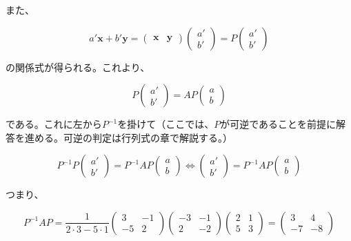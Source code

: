 \documentclass[dvipdfmx,autodetect-engine]{jsarticle}
\begin{document}
また、

$$
a'\bm{x} + b'\bm{y} = 
\begin{pmatrix}
\bm{x} & \bm{y}
\end{pmatrix}
\begin{pmatrix}
a' \\
b'
\end{pmatrix} =
P\begin{pmatrix}
a' \\
b'
\end{pmatrix}
$$

の関係式が得られる。これより、

$$
P\begin{pmatrix}
a' \\
b'
\end{pmatrix} = 
AP\begin{pmatrix}
a \\
b
\end{pmatrix}
$$

である。これに左から$P^{-1}$を掛けて（ここでは、$P$が可逆であることを前提に解答を進める。可逆の判定は行列式の章で解説する。）

$$
P^{-1}P\begin{pmatrix}
a' \\
b'
\end{pmatrix} =
P^{-1}AP\begin{pmatrix}
a \\
b
\end{pmatrix}
\Longleftrightarrow
\begin{pmatrix}
a' \\
b'
\end{pmatrix} =
P^{-1}AP\begin{pmatrix}
a \\
b
\end{pmatrix}
$$

つまり、

$$
P^{-1}AP = 
\frac{1}{2 \cdot 3 -5 \cdot 1}\begin{pmatrix}
3 & -1 \\
-5 & 2
\end{pmatrix}
\begin{pmatrix}
-3 & -1 \\
2 & -2
\end{pmatrix}
\begin{pmatrix}
2 & 1 \\
5 & 3
\end{pmatrix} = 
\begin{pmatrix}
3 & 4 \\
-7 & -8
\end{pmatrix}
$$
\end{document}
